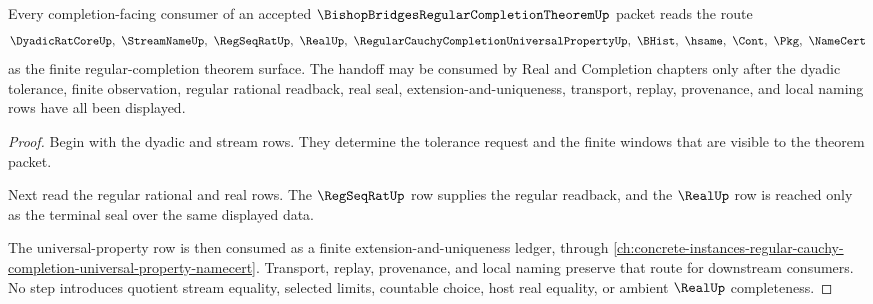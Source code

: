 \begin{theorem}
\label{thm:bishop-bridges-regular-completion-theorem-handoff}
Every completion-facing consumer of an accepted $\BishopBridgesRegularCompletionTheoremUp$ packet reads the route
$$
\DyadicRatCoreUp,\ \StreamNameUp,\ \RegSeqRatUp,\ \RealUp,\ \RegularCauchyCompletionUniversalPropertyUp,\ \BHist,\ \hsame,\ \Cont,\ \Pkg,\ \NameCert
$$
as the finite regular-completion theorem surface. The handoff may be consumed by Real and Completion chapters only after the dyadic tolerance, finite observation, regular rational readback, real seal, extension-and-uniqueness, transport, replay, provenance, and local naming rows have all been displayed.
\end{theorem}
\begin{proof}
Begin with the dyadic and stream rows. They determine the tolerance request and the finite windows that are visible to the theorem packet.

Next read the regular rational and real rows. The $\RegSeqRatUp$ row supplies the regular readback, and the $\RealUp$ row is reached only as the terminal seal over the same displayed data.

The universal-property row is then consumed as a finite extension-and-uniqueness ledger, through \autoref{ch:concrete-instances-regular-cauchy-completion-universal-property-namecert}. Transport, replay, provenance, and local naming preserve that route for downstream consumers. No step introduces quotient stream equality, selected limits, countable choice, host real equality, or ambient $\RealUp$ completeness.
\end{proof}




